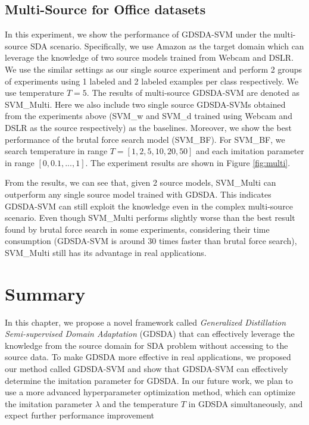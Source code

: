 \subsection{Multi-Source for Office datasets}
In this experiment, we show the performance of GDSDA-SVM under the multi-source SDA scenario.
Specifically, we use Amazon as the target domain which can leverage the knowledge of two source models trained from Webcam and DSLR.
We use the similar settings as our single source experiment and perform 2 groups of experiments using 1 labeled and 2 labeled examples per class respectively. We use temperature $T=5$. The results of multi-source GDSDA-SVM are denoted as SVM\_Multi. Here we also include two single source GDSDA-SVMs obtained from the experiments above (SVM\_w and SVM\_d trained using Webcam and DSLR as the source respectively) as the baselines. Moreover, we show the best performance of the brutal force search model (SVM\_BF). For SVM\_BF, we search temperature in range $T=[1,2,5,10,20,50]$ and each imitation parameter in range $[0,0.1,...,1]$. The experiment results are shown in Figure \ref{fig:multi}.

From the results, we can see that, given 2 source models, SVM\_Multi can outperform any single source model trained with GDSDA. This indicates GDSDA-SVM can still exploit the knowledge even in the complex multi-source scenario. Even though SVM\_Multi performs slightly worse than the best result found by brutal force search in some experiments, considering their time consumption (GDSDA-SVM is around 30 times faster than brutal force search), SVM\_Multi still has its advantage in real applications.

\section{Summary}\label{sec:aaai:con}
In this chapter, we propose a novel framework called \textit{Generalized Distillation Semi-supervised Domain Adaptation} (GDSDA) that can effectively leverage the knowledge from the source domain for SDA problem without accessing to the source data. To make GDSDA more effective in real applications, we proposed our method called GDSDA-SVM and show that GDSDA-SVM can effectively determine the imitation parameter for GDSDA. 
In our future work, we plan to use a more advanced hyperparameter optimization method, which can optimize the imitation parameter $\lambda$ and the temperature $T$ in GDSDA simultaneously, and expect
further performance improvement 